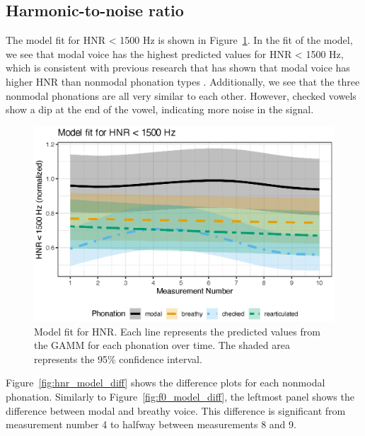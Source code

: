 \subsection{Harmonic-to-noise ratio} \label{sec:model_hnr}

The model fit for HNR < 1500 Hz is shown in Figure~\ref{fig:hnr_model_fit}. In the fit of the model, we see that modal voice has the highest predicted values for HNR < 1500 Hz, which is consistent with previous research that has shown that modal voice has higher HNR than nonmodal phonation types \citep[e.g.,][]{blankenshipTimeCourseBreathiness1997,blankenshipTimingNonmodalPhonation2002,dekromCepstrumBasedTechniqueDetermining1993,garellekTimingSequencingCoarticulated2012,garellekPhoneticsVoice2019,gerrattTaxonomyNonmodalPhonation2001}. Additionally, we see that the three nonmodal phonations are all very similar to each other. However, checked vowels show a dip at the end of the vowel, indicating more noise in the signal. 

\begin{figure}[h!]
    \centering
    \includegraphics[width = \linewidth]{images/LCH_GAMMs/hnr15_model_fit.eps}
    \caption{Model fit for HNR. Each line represents the predicted values from the GAMM for each phonation over time. The shaded area represents the 95\% confidence interval.}
    \label{fig:hnr_model_fit}
\end{figure}  

Figure~\ref{fig:hnr_model_diff} shows the difference plots for each nonmodal phonation. Similarly to Figure~\ref{fig:f0_model_diff}, the leftmost panel shows the difference between modal and breathy voice. This difference is significant from measurement number 4 to halfway between measurements 8 and 9. 


